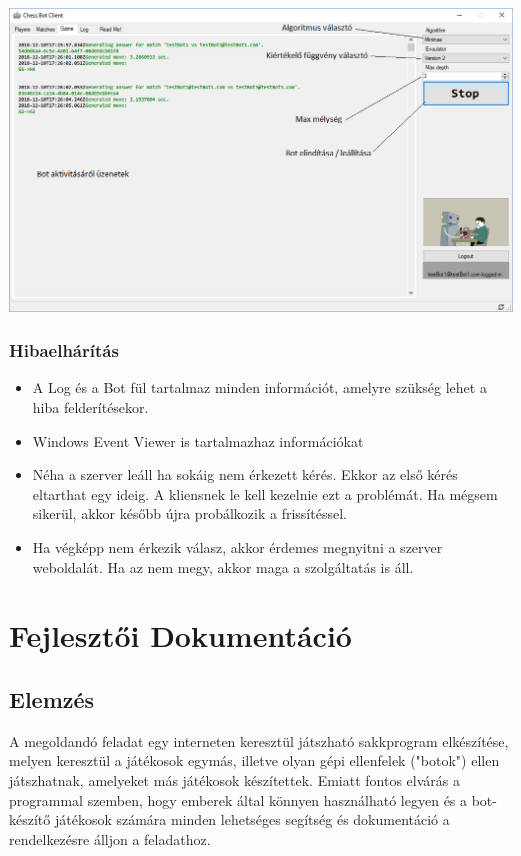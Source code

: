 \documentclass[twoside, a4paper, 12pt]{book}
\begin{document}
\includegraphics[width=1.0\textwidth]{img/botClient_3.png} \\

\section{Hibaelhárítás}
\begin{itemize}
	\item A Log és a Bot fül tartalmaz minden információt, amelyre szükség lehet a hiba felderítésekor.
	\item Windows Event Viewer is tartalmazhaz információkat
	\item Néha a szerver leáll ha sokáig nem érkezett kérés. Ekkor az első kérés eltarthat egy ideig. A kliensnek le kell kezelnie ezt a problémát. Ha mégsem sikerül, akkor később újra probálkozik a frissítéssel.
	\item Ha végképp nem érkezik válasz, akkor érdemes megnyitni a szerver weboldalát. Ha az nem megy, akkor maga a szolgáltatás is áll.
\end{itemize}

\newpage
\part{Fejlesztői Dokumentáció}
\chapter{Elemzés}
A megoldandó feladat egy interneten keresztül játszható sakkprogram elkészítése, melyen keresztül a játékosok egymás, illetve olyan gépi ellenfelek ("botok") ellen játszhatnak, amelyeket más játékosok készítettek. Emiatt fontos elvárás a programmal szemben, hogy emberek által könnyen használható legyen és a bot-készítő játékosok számára minden lehetséges segítség és dokumentáció a rendelkezésre álljon a feladathoz.
\end{document}
